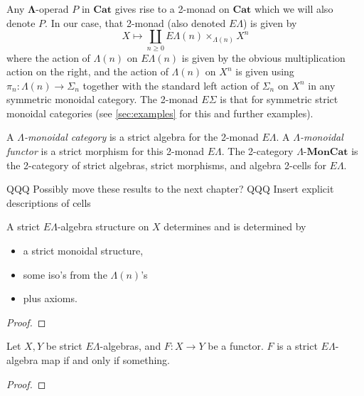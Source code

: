 \documentclass{amsbook} %
\newcommand{\mb}{\mathbf}
\newcommand{\EL}{E\Lambda}
\newcommand{\lmc}{\Lambda\mbox{-}\mb{MonCat}}
\numberwithin{section}{chapter}
\begin{document}
Any $\mb{\Lambda}$-operad $P$ in $\mb{Cat}$ gives rise to a 2-monad on $\mb{Cat}$ which we will also denote $P$.  In our case, that 2-monad (also denoted $E\Lambda$) is given by
\[
X \mapsto \coprod_{n \geq 0} E\Lambda(n) \times_{\Lambda(n)} X^{n}
\]
where the action of $\Lambda(n)$ on $E\Lambda(n)$ is given by the obvious multiplication action on the right, and the action of $\Lambda(n)$ on $X^{n}$ is given using $\pi_{n}:\Lambda(n) \rightarrow \Sigma_{n}$ together with the standard left action of $\Sigma_{n}$ on $X^{n}$ in any symmetric monoidal category.  The 2-monad $E\Sigma$ is that for symmetric strict monoidal categories (see \cref{sec:examples} for this and further examples).

\begin{Defi}\label{lmc}
A \emph{$\Lambda$-monoidal category} is a strict algebra for the 2-monad $\EL$. A \emph{$\Lambda$-monoidal functor} is a strict morphism for this 2-monad $\EL$. The 2-category $\lmc$ is the 2-category of strict algebras, strict morphisms, and algebra 2-cells for $\EL$.
\end{Defi}

QQQ Possibly move these results to the next chapter?
QQQ Insert explicit descriptions of cells
\begin{prop}\label{el_via_moncats}
A strict $\EL$-algebra structure on $X$ determines and is determined by
\begin{itemize}
\item a strict monoidal structure,
\item some iso's from the $\Lambda(n)$'s
\item plus axioms.
\end{itemize}
\end{prop}
\begin{proof}

\end{proof}

\begin{prop}\label{el_strictmap}
Let $X,Y$ be strict $\EL$-algebras, and $F:X \to Y$ be a functor. $F$ is a strict $\EL$-algebra map if and only if something.
\end{prop}
\begin{proof}

\end{proof}
\end{document}
